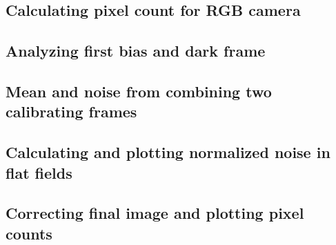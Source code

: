 \documentclass{emulateapj}
\begin{document}
\begin{appendices}
\subsection{Calculating pixel count for RGB camera}

\subsection{Analyzing first bias and dark frame}

\subsection{Mean and noise from combining two calibrating frames}

\subsection{Calculating and plotting normalized noise in flat fields}

\subsection{Correcting final image and plotting pixel counts}

\end{appendices}
\end{document}

